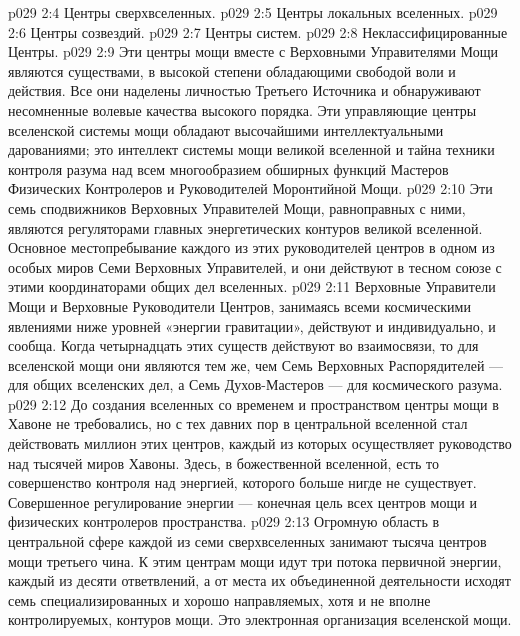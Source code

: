 \vs p029 2:4 \bibnobreakspace Центры сверхвселенных.
\vs p029 2:5 \bibnobreakspace Центры локальных вселенных.
\vs p029 2:6 \bibnobreakspace Центры созвездий.
\vs p029 2:7 \bibnobreakspace Центры систем.
\vs p029 2:8 \bibnobreakspace Неклассифицированные Центры.
\vs p029 2:9 \pc Эти центры мощи вместе с Верховными Управителями Мощи являются существами, в высокой степени обладающими свободой воли и действия. Все они наделены личностью Третьего Источника и обнаруживают несомненные волевые качества высокого порядка. Эти управляющие центры вселенской системы мощи обладают высочайшими интеллектуальными дарованиями; это интеллект системы мощи великой вселенной и тайна техники контроля разума над всем многообразием обширных функций Мастеров Физических Контролеров и Руководителей Моронтийной Мощи.
\vs p029 2:10 \pc {}\bibnobreakspace {} Эти семь сподвижников Верховных Управителей Мощи, равноправных с ними, являются регуляторами главных энергетических контуров великой вселенной. Основное местопребывание каждого из этих руководителей центров в одном из особых миров Семи Верховных Управителей, и они действуют в тесном союзе с этими координаторами общих дел вселенных.
\vs p029 2:11 Верховные Управители Мощи и Верховные Руководители Центров, занимаясь всеми космическими явлениями ниже уровней «энергии гравитации», действуют и индивидуально, и сообща. Когда четырнадцать этих существ действуют во взаимосвязи, то для вселенской мощи они являются тем же, чем Семь Верховных Распорядителей --- для общих вселенских дел, а Семь Духов\hyp{}Мастеров --- для космического разума.
\vs p029 2:12 \pc {}\bibnobreakspace {} До создания вселенных со временем и пространством центры мощи в Хавоне не требовались, но с тех давних пор в центральной вселенной стал действовать миллион этих центров, каждый из которых осуществляет руководство над тысячей миров Хавоны. Здесь, в божественной вселенной, есть то совершенство контроля над энергией, которого больше нигде не существует. Совершенное регулирование энергии --- конечная цель всех центров мощи и физических контролеров пространства.
\vs p029 2:13 \pc {}\bibnobreakspace {} Огромную область в центральной сфере каждой из семи сверхвселенных занимают тысяча центров мощи третьего чина. К этим центрам мощи идут три потока первичной энергии, каждый из десяти ответвлений, а от места их объединенной деятельности исходят семь специализированных и хорошо направляемых, хотя и не вполне контролируемых, контуров мощи. Это электронная организация вселенской мощи.
